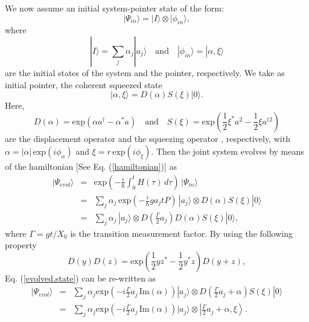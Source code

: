 \documentclass[aps,pra,preprint,superscriptaddress, showpacs]{revtex4-2}
\begin{document}
We now assume an initial system-pointer state of the form:
\begin{equation}
|\Psi_{in}\rangle=|I\rangle\otimes |\phi_{in}\rangle, 
\end{equation}
where
\begin{equation}
|I\rangle=\sum_{j} \alpha_{j}|a_{j}\rangle \quad \text{and} \quad |\phi_{in}\rangle=|\alpha, \xi\rangle
\end{equation}
are the initial states of the system and the pointer, respectively. We take as initial pointer, the coherent squeezed state \cite{caves1980quantum,caves1981quantum} 
\begin{equation}\label{squezeed.state}
|\alpha, \xi\rangle=D(\alpha)S(\xi)|0\rangle.
\end{equation}
Here, 
\begin{equation}
D(\alpha)=\textrm{exp}\left(\alpha a^{\dagger}-\alpha^{*}a\right) \quad \text{and} \quad S(\xi)=\textrm{exp}\left(\frac{1}{2}\xi^{*}a^{2}-\frac{1}{2}\xi a^{\dagger 2}\right)
\end{equation}
are the displacement operator and the squeezing operator \cite{glauber1963coherent,gerry2005introductory}, respectively, with $\alpha=|\alpha|\, \textrm{exp}(i\phi_{\alpha})$ and $\xi=r\,\textrm{exp}(i\phi_{\xi})$.
Then the joint system evolves by means of the hamiltonian [See Eq. (\ref{hamiltonian})] as
\begin{eqnarray}\label{evolved.state}
|\Psi_{evol}\rangle &=&\textrm{exp}\left(-\frac{i}{\hbar}\int_{0}^{t} H(\tau)\,d\tau\right)\,|\Psi_{in}\rangle \nonumber \\
&=&\sum_{j}\alpha_{j}\,\textrm{exp}\left(-\frac{i}{\hbar}ga_{j}t P\right)\,|a_{j}\rangle\otimes D(\alpha)S(\xi)|0\rangle\nonumber\\
&=&\sum_{j} \alpha_{j}\,|a_{j}\rangle\otimes D\left(\frac{\Gamma}{2}a_{j} \right)D(\alpha)S(\xi)|0\rangle,
\end{eqnarray}
where $\Gamma=gt/X_{0}$ is the transition measurement factor. By using the following property \cite{gerry2005introductory}
\begin{equation}\label{coherent.property}
D(y)D(z)=\textrm{exp}\left(\frac{1}{2}yz^{*}-\frac{1}{2}y^{*}z\right) D(y+z),
\end{equation}
Eq. (\ref{evolved.state}) can be re-written as
\begin{eqnarray}
|\Psi_{evol}\rangle&=&\sum_{j}\alpha_{j}\textrm{exp}\left(-i \frac{\Gamma}{2}a_{j}\,\textrm{Im}(\alpha)\right)|a_{j}\rangle\otimes  D\left(\frac{\Gamma}{2}a_{j}+\alpha\right)S(\xi)|0\rangle \nonumber\\
&=&\sum_{j}\alpha_{j}\textrm{exp}\left(-i \frac{\Gamma}{2}a_{j}\,\textrm{Im}(\alpha)\right)|a_{j}\rangle\otimes\left|\frac{\Gamma}{2}a_{j}+\alpha, \xi\right\rangle.
\end{eqnarray}
\end{document}
